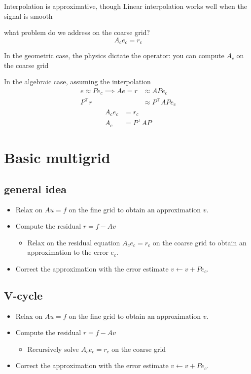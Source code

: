 \documentclass{article}
\begin{document}
Interpolation is approximative, though Linear interpolation works well when the signal is smooth

what problem do we address on the coarse grid?
\[
A_{c}e_{c} = r_{c}
\]

In the geometric case, the physics dictate the operator: you can compute $A_{c}$ on the coarse grid

In the algebraic case, assuming the interpolation
\begin{align*}
    e \approx Pe_{c} \implies Ae = r & \approx APe_{c} \\ 
    P^{\top}r & \approx P^{\top}APe_{c}
\end{align*}
\begin{align*}
    A_{c}e_{c} & = r_{c} \\ 
    A_{c} & = P^{\top}AP
\end{align*}


\section{Basic multigrid}

\subsection{general idea}

\begin{itemize}
    \item Relax on $Au = f$ on the fine grid to obtain an approximation $v$.
    \item Compute the residual $r = f - Av$
    \begin{itemize}
        \item Relax on the residual equation $A_{c}e_{c} = r_{c}$ on the coarse grid to obtain an approximation to the error $e_{c}$.
    \end{itemize}
    \item Correct the approximation with the error estimate $v \leftarrow v + Pe_{c}$.
\end{itemize}

\subsection{V-cycle}

\begin{itemize}
    \item Relax on $Au = f$ on the fine grid to obtain an approximation $v$.
    \item Compute the residual $r = f - Av$
    \begin{itemize}
        \item Recursively solve $A_{c}e_{c} = r_{c}$ on the coarse grid
    \end{itemize}
    \item Correct the approximation with the error estimate $v \leftarrow v + Pe_{c}$.
\end{itemize}
\end{document}

